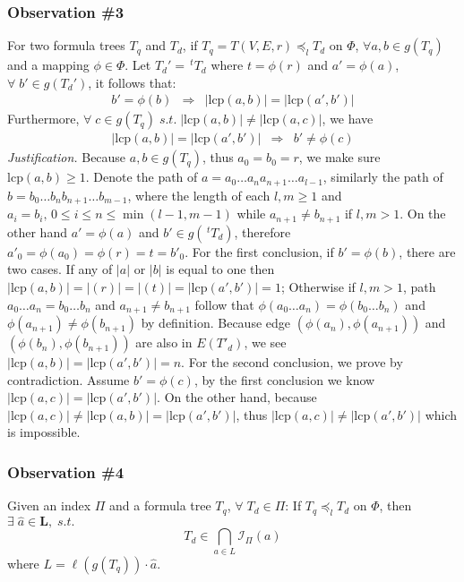 \subsubsection*{Observation \#3} 
For two formula trees $T_q$ and $T_d$, if $T_q = T(V,E,r) \preceq_l T_d$ on $\Phi$,  
$\forall a,b \in g(T_q)$ and a mapping $\phi \in \Phi$. 
Let $T_d' = \, ^{t}T_d$ where $t = \phi(r)$ and $a' = \phi(a)$, $\forall\; b' \in g(T_d')$, it follows that:
$$
\begin{array}{lcr}
b' = \phi(b)  & \Rightarrow & 
\left| \mathrm{lcp}(a,b) \right| = \left| \mathrm{lcp}(a',b') \right|
\end{array}
$$
Furthermore, $\forall\; c \in g(T_q)\; s.t.\; \left| \mathrm{lcp}(a,b) \right| \neq \left| \mathrm{lcp}(a,c) \right| $, we have
$$
\begin{array}{lcr}
\left| \mathrm{lcp}(a,b) \right| = \left| \mathrm{lcp}(a',b') \right|
& \Rightarrow &
b' \neq \phi(c)
\end{array} 
$$
\textit{Justification.} 
Because $a,b \in g(T_q)$, thus $a_0 = b_0 = r$, we make sure $\mathrm{lcp}(a,b) \ge 1$. 
Denote the path of $a = a_0 \ldots a_n a_{n+1} \ldots a_{l-1}$, similarly the path of $b=b_0 \ldots b_n b_{n+1} \ldots b_{m-1}$,
where the length of each $l,m \ge 1$ and $a_i = b_i,\, 0 \le i \le n \le \min(l-1, m-1)$ while $a_{n+1} \neq b_{n+1}$ if $l,m > 1$.
On the other hand $a' = \phi(a)$ and $b' \in g(\,^{t}T_d)$, therefore $a'_0 = \phi(a_0) = \phi(r) = t = b'_0$.
For the first conclusion, if $b' = \phi(b)$, there are two cases. If any of $|a|$ or $|b|$ is equal to one then $\left| \mathrm{lcp}(a,b) \right| = |(r)| = |(t)| = \left| \mathrm{lcp}(a',b') \right| = 1$;
Otherwise if $l,m > 1$, path $a_0 \ldots a_n = b_0 \ldots b_n$ and $a_{n+1} \neq b_{n+1}$ follow that $\phi(a_0 \ldots a_n) = \phi(b_0 \ldots b_n)$ and $\phi(a_{n+1}) \neq \phi(b_{n+1})$ by definition.
Because edge $(\phi(a_n), \phi(a_{n+1}))$ and $(\phi(b_n), \phi(b_{n+1}))$ are also in $E(T'_d)$, 
we see $\left| \mathrm{lcp}(a,b) \right| = \left| \mathrm{lcp}(a',b') \right| = n$.
For the second conclusion, we prove by contradiction. 
Assume $b' = \phi(c)$, by the first conclusion we know $\left| \mathrm{lcp}(a,c) \right| = \left| \mathrm{lcp}(a',b') \right|$.
On the other hand, because $\left| \mathrm{lcp}(a,c) \right| \neq \left| \mathrm{lcp}(a,b) \right| =  \left| \mathrm{lcp}(a',b') \right|$, 
thus $\left| \mathrm{lcp}(a,c) \right| \neq \left| \mathrm{lcp}(a',b') \right|$ which is impossible. 

\subsubsection*{Observation \#4} 
Given an index $\Pi$ and a formula tree $T_q$, $\forall\; T_d \in \Pi$:
If $T_q \preceq_l T_d$ on $\Phi$, then $\exists\; \hat{a} \in \mathbf{L},\; s.t.$
$$
T_d \in \bigcap_{a \in L} \mathcal{I}_{\Pi}(a)
$$
where $L = \ell(g(T_q)) \cdot \hat{a}$. 

